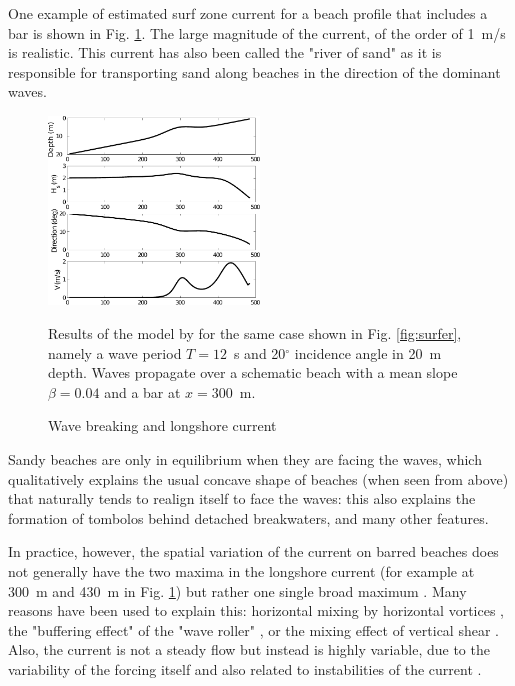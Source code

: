 One example of estimated surf zone current for a beach profile that includes a bar is shown in Fig. \ref{fig:surfer_cur}. The large magnitude of the current, of the order of 1~m/s is realistic. This current has also been called the "river of sand" as it is responsible for transporting sand along beaches in the direction of the dominant waves. 
\begin{figure}[htb]
\centerline{\includegraphics[width=0.5\textwidth]{FIGS_CH_NEARSHORE/surfer_cur.pdf}}
  \caption{Wave breaking and longshore current}
    {Results of the model by \cite{Thornton&Guza1986}  for the same case shown in Fig. \ref{fig:surfer}, namely a wave period $T=12$~s and 20$^\circ$ incidence angle 
    in 20~m depth. Waves propagate over a schematic beach with a mean slope $\beta=0.04$ 
    and a bar at $x=300$~m.}
\label{fig:surfer_cur}
\end{figure}
Sandy beaches are only in equilibrium when they are facing the waves, which qualitatively explains the usual concave shape of beaches (when seen from above) that naturally tends to realign itself to face the waves: this also explains the formation of tombolos behind detached breakwaters, and many other features. 

In practice, however, the spatial variation of the current on barred beaches does not generally have the two maxima in the longshore current (for example at 300~m and 430~m in Fig. \ref{fig:surfer_cur}) but rather one single broad maximum \citep{Reniers&Battjes1997}. Many reasons have been used to explain this: horizontal mixing by horizontal vortices \citep{Church&Thornton1993,Brocchini&al.2004}, the "buffering effect" of the "wave roller" \citep{Lippmann&al.1996}, or the mixing effect of vertical shear \citep{Putrevu&Svendsen1999}.  Also, the current is not a steady flow but instead is highly variable, due to the variability of the forcing itself and also related to instabilities of the current \citep{Oltman-Shay&al.1989}.


